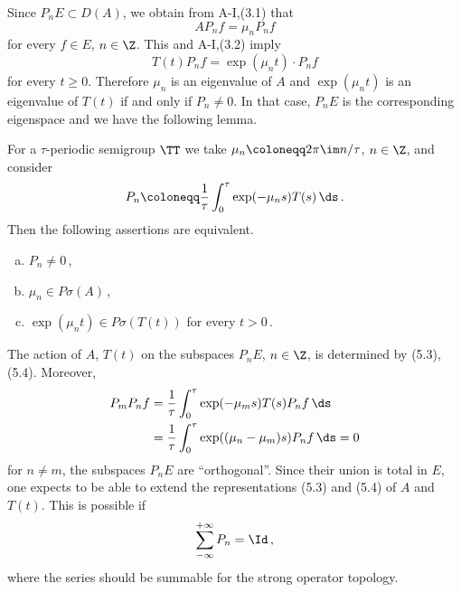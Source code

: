 Since $P_{n}E \subset D(A)$, we obtain from A-I,(3.1) that
\begin{equation}\label{eq:a3-5.3}
AP_{n}f = \mu_{n}P_{n}f
\end{equation}
for every $f \in E$, $n \in \Z$.
This and A-I,(3.2) imply
\begin{equation}\label{eq:a3-5.4}
T(t)P_{n}f = \exp(\mu_{n}t) \cdot P_{n}f
\end{equation}
for every $t \geq 0$.
Therefore $\mu_{n}$ is an eigenvalue of $A$ and $\exp(\mu_{n}t)$ is an eigenvalue of $T(t)$ if and only if $P_{n} \neq 0$.
In that case, $P_{n}E$ is the corresponding eigenspace and we have the following lemma.
\begin{lemma}\label{lem:a3-5.3}
For a $\tau$-periodic semigroup $\TT$ we take $\mu_{n} \coloneqq 2\pi\im n/\tau$, $n \in \Z$, and consider
\[
P_{n} \coloneqq \frac{1}{\tau}\int_{0}^{\tau} \exp(-\mu_{n}s)T(s) \, \ds\,.
\]
Then the following assertions are equivalent.
\begin{enumerate}[(a)]
\item 
$P_{n} \neq 0$\,,

\item 
$\mu_{n} \in P\sigma(A)$\,,

\item 
$\exp(\mu_{n}t) \in P\sigma(T(t))$ for every $t > 0$\,.

\end{enumerate}
\end{lemma}
The action of $A$, \resp $T(t)$ on the subspaces $P_{n}E$, $n \in \Z$, is determined by (5.3), \resp (5.4).
Moreover,
\begin{align*}
P_{m}P_{n}f &=  \frac{1}{\tau}\int_{0}^{\tau} \exp(-\mu_{m}s)T(s)P_{n}f \, \ds \\
&=  \frac{1}{\tau}\int_{0}^{\tau} \exp((\mu_{n}-\mu_{m})s)P_{n}f \, \ds = 0
\end{align*}
for $n \neq m$, \ie the subspaces $P_{n}E$ are \enquote{orthogonal}.
Since their union is total in $E$, one expects to be able to extend the representations (5.3) and (5.4) of $A$ and $T(t)$.
This is possible if
\[
\sum_{-\infty}^{+\infty} P_{n} = \Id\,,
\]
where the series should be summable for the strong operator topology.

